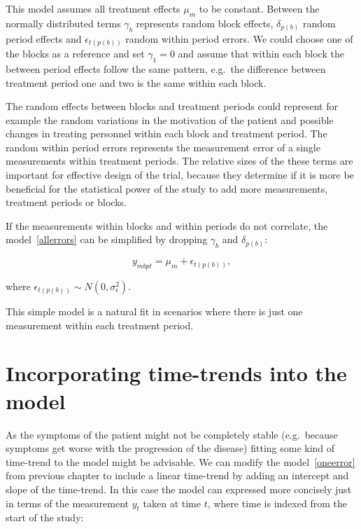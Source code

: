 \documentclass[12pt,a4paper,leqno]{report}
\theoremstyle{plain}
\theoremstyle{definition}
\theoremstyle{remark}
\begin{document}
This model assumes all treatment effects \(\mu_m\) to be constant. Between the normally
distributed terms \(\gamma_b\) represents random block effects, \(\delta_{p(b)}\)
random period effects and \(\epsilon_{t(p(b))}\) random within period errors. We could choose one
of the blocks as a reference and set \(\gamma_1 = 0\) and assume that within each block
the between period effects follow the same pattern, e.g.\ the difference between treatment
period one and two is the same within each block.

The random effects between blocks and treatment periods could represent for example the
random variations in the motivation of the patient and possible changes in treating
personnel within each block and treatment period. The random within period errors represents
the measurement error of a single measurements within treatment periods. The relative sizes
of the these terms are important for effective design of the trial, because they determine
if it is more be beneficial for the statistical power of the study to add more measurements,
treatment periods or blocks.

If the measurements within blocks and within periods do not correlate, the model\ \ref{allerrors}
can be simplified by dropping \(\gamma_b\) and \(\delta_{p(b)}\):

\begin{def}\label{}
    \begin{equation}\label{oneerror}
        y_{mbpt} = \mu_m + \epsilon_{t(p(b))},
    \end{equation}
\end{def}where \(\epsilon_{t(p(b))} \sim N(0,\sigma^2_{\epsilon})\).

This simple model is a natural fit in scenarios where there is just one measurement within each
treatment period.

\section{Incorporating time-trends into the model}\label{timetrends}

As the symptoms of the patient might not be completely stable (e.g.\ because symptoms get
worse with the progression of the disease) fitting some kind of time-trend to the model
might be advisable. We can modify the model\ \ref{oneerror} from previous chapter to include a linear
time-trend by adding an intercept and slope of the time-trend. In this case
the model can expressed more concisely just in terms of the measurement \(y_t\) taken at time \(t\),
where time is indexed from the start of the study:
\end{document}
